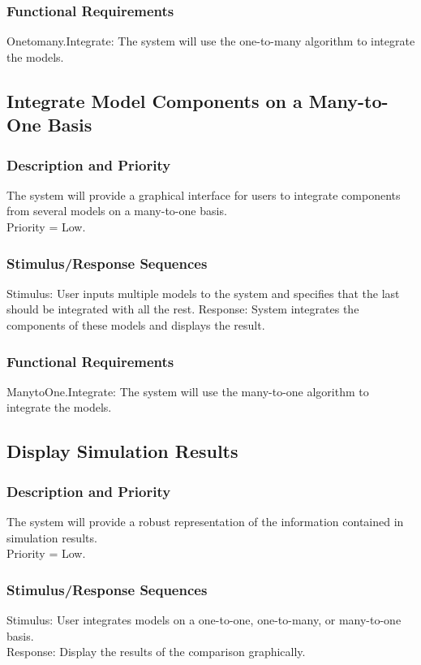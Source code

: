\documentclass{article}
\begin{document}
\subsubsection{Functional Requirements}
Onetomany.Integrate: The system will use the one-to-many algorithm to integrate the models.

\subsection{Integrate Model Components on a Many-to-One Basis}
\subsubsection{Description and Priority}
The system will provide a graphical interface for users to integrate components from several models on a many-to-one basis.\\
Priority = Low.

\subsubsection{Stimulus/Response Sequences}
Stimulus: User inputs multiple models to the system and specifies that the last should be integrated with all the rest.
Response: System integrates the components of these models and displays the result.

\subsubsection{Functional Requirements}
ManytoOne.Integrate: The system will use the many-to-one algorithm to integrate the models.

\subsection{Display Simulation Results}
\subsubsection{Description and Priority}
The system will provide a robust representation of the information contained in simulation results.\\
Priority = Low.

\subsubsection{Stimulus/Response Sequences}
Stimulus: User integrates models on a one-to-one, one-to-many, or many-to-one basis.\\
Response: Display the results of the comparison graphically.
\end{document}
